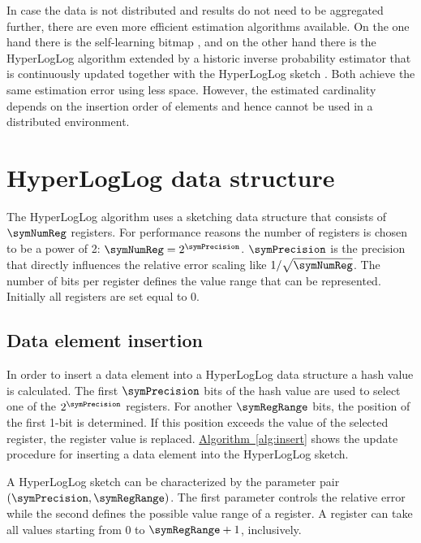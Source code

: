 \documentclass[a4paper]{scrartcl}
\newcommand*{\algoref}[1]{\hyperref[#1]{Algorithm~\ref*{#1}}}
\begin{document}
In case the data is not distributed and results do not need to be aggregated further, there are even more efficient estimation algorithms available. On the one hand there is the self-learning bitmap \cite{Chen2011, Chen2015}, and on the other hand there is the HyperLogLog algorithm extended by a historic inverse probability estimator that is continuously updated together with the HyperLogLog sketch \cite{Ting2014}. Both achieve the same estimation error using less space. However, the estimated cardinality depends on the insertion order of elements and hence cannot be used in a distributed environment. 


\section{HyperLogLog data structure}
The HyperLogLog algorithm uses a sketching data structure that consists of $\symNumReg$ registers. For performance reasons the number of registers is chosen to be a power of 2: $\symNumReg = 2^\symPrecision$. $\symPrecision$ is the precision that directly influences the relative error scaling like $1/\sqrt{\symNumReg}$. The number of bits per register defines the value range that can be represented. Initially all registers are set equal to 0. 


\subsection{Data element insertion}
In order to insert a data element into a HyperLogLog data structure a hash value is calculated. The first $\symPrecision$ bits of the hash value are used to select one of the $2^\symPrecision$ registers. For another $\symRegRange$ bits, the position of the first 1-bit is determined. If this position exceeds the value of the selected register, the register value is replaced. \algoref{alg:insert} shows the update procedure for inserting a data element into the HyperLogLog sketch.

A HyperLogLog sketch can be characterized by the parameter pair $(\symPrecision, \symRegRange)$. The first parameter controls the relative error while the second defines the possible value range of a register. A register can take all values starting from 0 to $\symRegRange+1$, inclusively. 
\end{document}
